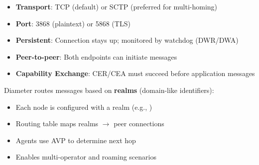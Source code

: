
\begin{itemize}
\tightlist
\item
  \textbf{Transport}: TCP (default) or SCTP (preferred for multi-homing)
\item
  \textbf{Port}: 3868 (plaintext) or 5868 (TLS)
\item
  \textbf{Persistent}: Connection stays up; monitored by watchdog (DWR/\allowbreak{}DWA)
\item
  \textbf{Peer-to-peer}: Both endpoints can initiate messages
\item
  \textbf{Capability Exchange}: CER/\allowbreak{}CEA must succeed before application messages
\end{itemize}


Diameter routes messages based on \textbf{realms} (domain-like identifiers):

\begin{itemize}
\tightlist
\item
  Each node is configured with a realm (e.g., \allowbreak{}\allowbreak{}\allowbreak{}\allowbreak{})
\item
  Routing table maps realms \ensuremath{\to} peer connections
\item
  Agents use  AVP to determine next hop
\item
  Enables multi-operator and roaming scenarios
\end{itemize}




\CNchained{}


